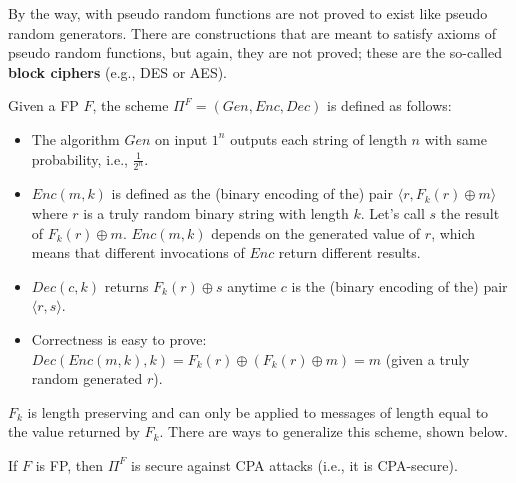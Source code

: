 \documentclass[../main]{subfiles}
\begin{document}
\noindent
By the way,  with pseudo random functions are not proved to exist like pseudo random generators.
There are constructions that are meant to satisfy axioms of pseudo random functions, but again, they are not proved; these are the so-called \textbf{block ciphers} (e.g., DES or AES).

\begin{definition}
    Given a FP $F$, the scheme $\Pi^F = (Gen,Enc,Dec)$ is defined as follows:
    \begin{itemize}
        \item The algorithm $Gen$ on input $1^n$ outputs each string of length $n$ with same probability, i.e., $\frac{1}{2^n}$.
        \item $Enc(m,k)$ is defined as the (binary encoding of the) pair $\langle r, F_k(r)\oplus m \rangle$ where $r$ is a truly random binary string with length $k$. Let's call $s$ the result of $ F_k(r)\oplus m $. $Enc(m,k)$ depends on the generated value of $r$, which means that different invocations of $Enc$ return different results.
        \item $Dec(c,k)$ returns $F_k(r)\oplus s$ anytime $c$ is the (binary encoding of the) pair $\langle r, s \rangle$.
        \item Correctness is easy to prove: $Dec(Enc(m,k),k)=F_k(r)\oplus(F_k(r)\oplus m)=m$ (given a truly random generated $r$).
    \end{itemize}
    $F_k$ is length preserving and can only be applied to messages of length equal to the value returned by $F_k$.
    There are ways to generalize this scheme, shown below.
\end{definition}


\begin{theorem}
	\label{theorem:fp-cpa-secure}
	If $F$ is FP, then $\Pi^F$ is secure against CPA attacks (i.e., it is CPA-secure).
\end{theorem}
\end{document}
